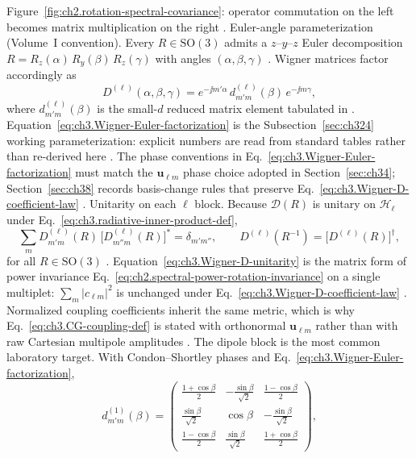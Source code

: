 Figure~\ref{fig:ch2.rotation-spectral-covariance}: operator commutation on the left becomes matrix
multiplication on the right \cite{stratton1941}.
Euler-angle parameterization (Volume~I convention). Every \(R\in\mathrm{SO}(3)\) admits a \(z\)--\(y\)--\(z\) Euler decomposition
\(R=R_z(\alpha)\,R_y(\beta)\,R_z(\gamma)\) with angles \((\alpha,\beta,\gamma)\)
\cite{jackson1999}. Wigner matrices factor accordingly as
\begin{equation}
\label{eq:ch3.Wigner-Euler-factorization}
D^{(\ell)}(\alpha,\beta,\gamma)
=
e^{-\jj m'\alpha}\,d^{(\ell)}_{m'm}(\beta)\,e^{-\jj m\gamma},
\end{equation}
where \(d^{(\ell)}_{m'm}(\beta)\) is the small-\(d\) reduced matrix element tabulated in
\cite{jackson1999}. Equation~\eqref{eq:ch3.Wigner-Euler-factorization} is the
Subsection~\ref{sec:ch324} working parameterization: explicit numbers are read from standard tables rather than
re-derived here \cite{hansen1988}. The phase conventions in Eq.~\eqref{eq:ch3.Wigner-Euler-factorization} must
match the \(\mathbf{u}_{\ell m}\) phase choice adopted in Section~\ref{sec:ch34}; Section~\ref{sec:ch38}
records basis-change rules that preserve Eq.~\eqref{eq:ch3.Wigner-D-coefficient-law}
\cite{hansen1988}.
Unitarity on each \(\ell\) block. Because \(\mathcal{D}(R)\) is unitary on \(\mathcal{H}_{\ell}\) under
Eq.~\eqref{eq:ch3.radiative-inner-product-def},
\begin{equation}
\label{eq:ch3.Wigner-D-unitarity}
\sum_{m}D^{(\ell)}_{m'm}(R)\,\big[D^{(\ell)}_{m''m}(R)\big]^{*}
=
\delta_{m'm''},
\qquad
D^{(\ell)}(R^{-1})=\big[D^{(\ell)}(R)\big]^{\dagger},
\end{equation}
for all \(R\in\mathrm{SO}(3)\) \cite{jackson1999}. Equation~\eqref{eq:ch3.Wigner-D-unitarity} is the
matrix form of power invariance Eq.~\eqref{eq:ch2.spectral-power-rotation-invariance} on a single multiplet:
\(\sum_m|c_{\ell m}|^{2}\) is unchanged under Eq.~\eqref{eq:ch3.Wigner-D-coefficient-law}
\cite{stratton1941}. Normalized coupling coefficients inherit the same metric, which is why
Eq.~\eqref{eq:ch3.CG-coupling-def} is stated with orthonormal \(\mathbf{u}_{\ell m}\) rather than with raw
Cartesian multipole amplitudes \cite{hansen1988}.
The dipole block is the most common laboratory target. With Condon--Shortley phases and
Eq.~\eqref{eq:ch3.Wigner-Euler-factorization},
\begin{equation}
\label{eq:ch3.Wigner-d1-beta}
d^{(1)}_{m'm}(\beta)
=
\begin{pmatrix}
\frac{1+\cos\beta}{2} & -\frac{\sin\beta}{\sqrt{2}} & \frac{1-\cos\beta}{2} \\[4pt]
\frac{\sin\beta}{\sqrt{2}} & \cos\beta & -\frac{\sin\beta}{\sqrt{2}} \\[4pt]
\frac{1-\cos\beta}{2} & \frac{\sin\beta}{\sqrt{2}} & \frac{1+\cos\beta}{2}
\end{pmatrix},
\end{equation}
